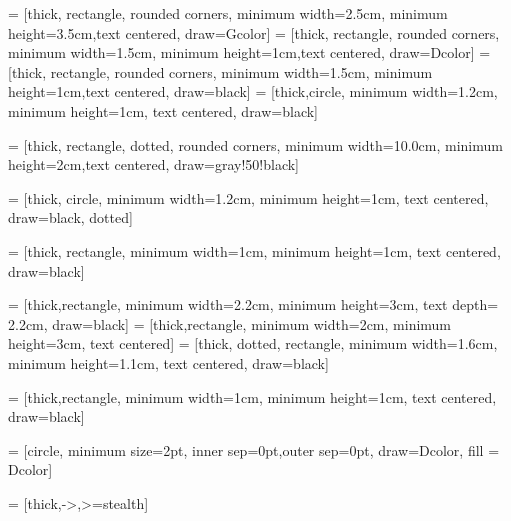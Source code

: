 



 = [thick, rectangle, rounded corners, minimum width=2.5cm, minimum height=3.5cm,text centered, draw=Gcolor]
 = [thick, rectangle, rounded corners, minimum width=1.5cm, minimum height=1cm,text centered, draw=Dcolor]
 = [thick, rectangle, rounded corners, minimum width=1.5cm, minimum height=1cm,text centered, draw=black]
 = [thick,circle, minimum width=1.2cm, minimum height=1cm, text centered, draw=black]

 = [thick, rectangle, dotted, rounded corners, minimum width=10.0cm, minimum height=2cm,text centered, draw=gray!50!black]

 = [thick, circle, minimum width=1.2cm, minimum height=1cm, text centered, draw=black, dotted]

 = [thick, rectangle, minimum width=1cm, minimum height=1cm, text centered, draw=black]

 = [thick,rectangle, minimum width=2.2cm, minimum height=3cm, text depth= 2.2cm, draw=black]
 = [thick,rectangle, minimum width=2cm, minimum height=3cm, text centered]
 = [thick, dotted, rectangle, minimum width=1.6cm, minimum height=1.1cm, text centered, draw=black]


 = [thick,rectangle, minimum width=1cm, minimum height=1cm, text centered, draw=black]


 = [circle, minimum size=2pt, inner sep=0pt,outer sep=0pt, draw=Dcolor, fill = Dcolor]

 = [thick,->,>=stealth]

